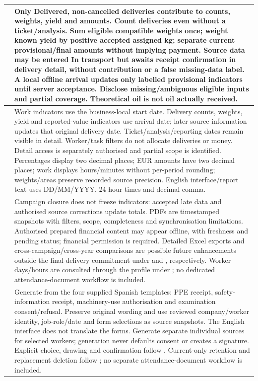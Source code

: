 {\begin{longtable}{L{0.12}L{0.88}}
\midrule
{}\label{br:038}\textbf{} & Only Delivered, non-cancelled deliveries contribute to counts, weights, yield and amounts. Count deliveries even without a ticket/analysis. Sum eligible compatible weights once; weight known yield by positive accepted assigned kg; separate current provisional/final amounts without implying payment. Source data may be entered In transport but awaits receipt confirmation in delivery detail, without contribution or a false missing-data label. A local offline arrival updates only labelled provisional indicators until server acceptance. Disclose missing/ambiguous eligible inputs and partial coverage. Theoretical oil is not oil actually received. \\
\midrule
{}\label{br:039}\textbf{} & Work indicators use the business-local start date. Delivery counts, weights, yield and reported-value indicators use arrival date; later source information updates that original delivery date. Ticket/analysis/reporting dates remain visible in detail. Worker/task filters do not allocate deliveries or money. Detail access is separately authorised and partial scope is identified. Percentages display two decimal places; EUR amounts have two decimal places; work displays hours/minutes without per-period rounding; weights/areas preserve recorded source precision. English interface/report text uses DD/MM/YYYY, 24-hour times and decimal comma. \\
\midrule
{}\label{br:040}\textbf{} & Campaign closure does not freeze indicators: accepted late data and authorised source corrections update totals. PDFs are timestamped snapshots with filters, scope, completeness and synchronisation limitations. Authorised prepared financial content may appear offline, with freshness and pending status; financial permission is required. Detailed Excel exports and cross-campaign/cross-year comparisons are possible future enhancements outside the final-delivery commitment under  and , respectively.
Worker days/hours are consulted through the profile under ; no dedicated attendance-document workflow is included. \\
\midrule
{}\label{br:041}\textbf{} & Generate from the four supplied Spanish templates: PPE receipt, safety-information receipt, machinery-use authorisation and examination consent/refusal. Preserve original wording and use reviewed company/worker identity, job-role/date and form selections as source snapshots. The English interface does not translate the forms. Generate separate individual sources for selected workers; generation never defaults consent or creates a signature. Explicit choice, drawing and confirmation follow . Current-only retention and replacement deletion follow ; no separate attendance-document workflow is included. \\

\end{longtable}}
